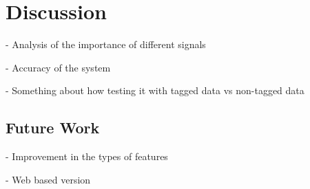 \chapter{Discussion}
- Analysis of the importance of different signals

- Accuracy of the system

- Something about how testing it with tagged data vs non-tagged data

\section{Future Work}
- Improvement in the types of features

- Web based version
